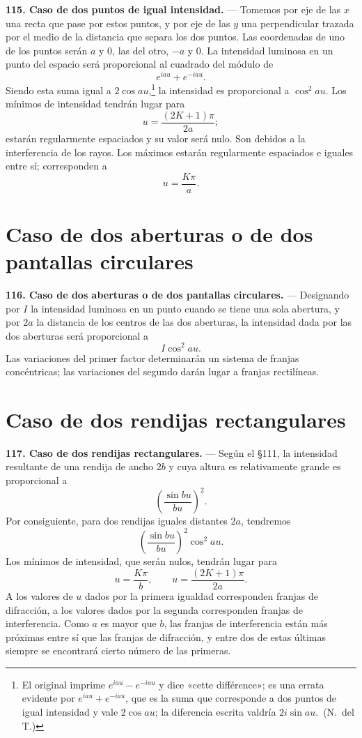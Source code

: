\noindent\textbf{115. Caso de dos puntos de igual intensidad.} — Tomemos
por eje de las $x$ una recta que pase por estos puntos, y por eje de las
$y$ una perpendicular trazada por el medio de la distancia que separa los
dos puntos. Las coordenadas de uno de los puntos serán $a$ y $0$, las del
otro, $-a$ y $0$. La intensidad luminosa en un punto del espacio será
proporcional al cuadrado del módulo de
\[
e^{iau}+e^{-iau}.
\]
Siendo esta suma igual a $2\cos au$,\footnote{El original imprime
$e^{iau}-e^{-iau}$ y dice «cette différence»; es una errata evidente por
$e^{iau}+e^{-iau}$, que es la suma que corresponde a dos puntos de igual
intensidad y vale $2\cos au$; la diferencia escrita valdría
$2i\sin au$.~(N.~del T.)} la intensidad es proporcional
a $\cos^2 au$. Los mínimos de intensidad tendrán lugar para
\[
u = \frac{(2K+1)\pi}{2a};
\]
estarán regularmente espaciados y su valor será nulo. Son debidos a la
interferencia de los rayos. Los máximos estarán regularmente espaciados e
iguales entre sí; corresponden a
\[
u = \frac{K\pi}{a}.
\]

\section{Caso de dos aberturas o de dos pantallas circulares}

\noindent\textbf{116. Caso de dos aberturas o de dos pantallas
circulares.} — Designando por $I$ la intensidad luminosa en un punto
cuando se tiene una sola abertura, y por $2a$ la distancia de los centros
de las dos aberturas, la intensidad dada por las dos aberturas será
proporcional a
\[
I\cos^2 au.
\]
Las variaciones del primer factor determinarán un sistema de franjas
concéntricas; las variaciones del segundo darán lugar a franjas
rectilíneas.

\section{Caso de dos rendijas rectangulares}

\noindent\textbf{117. Caso de dos rendijas rectangulares.} — Según el
§111, la intensidad resultante de una rendija de ancho $2b$ y cuya altura
es relativamente grande es proporcional a
\[
\left(\frac{\sin bu}{bu}\right)^2.
\]
Por consiguiente, para dos rendijas iguales distantes $2a$, tendremos
\[
\left(\frac{\sin bu}{bu}\right)^2 \cos^2 au.
\]
Los mínimos de intensidad, que serán nulos, tendrán lugar para
\[
u=\frac{K\pi}{b},\qquad u=\frac{(2K+1)\pi}{2a}.
\]
A los valores de $u$ dados por la primera igualdad corresponden franjas
de difracción, a los valores dados por la segunda corresponden franjas de
interferencia. Como $a$ es mayor que $b$, las franjas de interferencia
están más próximas entre sí que las franjas de difracción, y entre dos de
estas últimas siempre se encontrará cierto número de las primeras.

